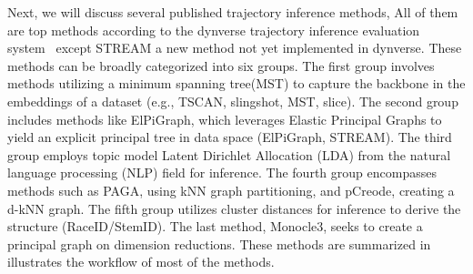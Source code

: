 Next, we will discuss several published trajectory inference methods, All of them are top methods according to the dynverse trajectory inference evaluation system~\citep{saelens2019comparison} except STREAM a new method not yet implemented in dynverse. These methods can be broadly categorized into six groups. The first group involves methods utilizing a minimum spanning tree(MST) to capture the backbone in the embeddings of a dataset (e.g., TSCAN, slingshot, MST, slice). The second group includes methods like ElPiGraph, which leverages Elastic Principal Graphs to yield an explicit principal tree in data space (ElPiGraph, STREAM). The third group employs topic model Latent Dirichlet Allocation (LDA) from the natural language processing (NLP) field for inference. The fourth group encompasses methods such as PAGA, using kNN graph partitioning, and pCreode, creating a d-kNN graph. The fifth group utilizes cluster distances for inference to derive the structure (RaceID/StemID). The last method, Monocle3, seeks to create a principal graph on dimension reductions. These methods are summarized in  illustrates the workflow of most of the methods.
